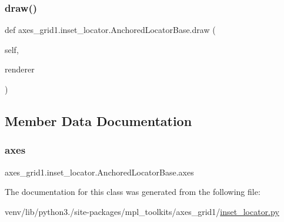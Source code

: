 \subsubsection{\texorpdfstring{draw()}{draw()}}
{\footnotesize\ttfamily def axes\+\_\+grid1.\+inset\+\_\+locator.\+Anchored\+Locator\+Base.\+draw (\begin{DoxyParamCaption}\item[{}]{self,  }\item[{}]{renderer }\end{DoxyParamCaption})}



\subsection{Member Data Documentation}
\mbox{\label{classaxes__grid1_1_1inset__locator_1_1AnchoredLocatorBase_a23ab77b0ced871503d9b10c9d24bb685}} 
\subsubsection{\texorpdfstring{axes}{axes}}
{\footnotesize\ttfamily axes\+\_\+grid1.\+inset\+\_\+locator.\+Anchored\+Locator\+Base.\+axes}



The documentation for this class was generated from the following file\+:\begin{DoxyCompactItemize}
\item 
venv/lib/python3./site-\/packages/mpl\+\_\+toolkits/axes\+\_\+grid1/\hyperlink{_2inset__locator_8py}{inset\+\_\+locator.\+py}\end{DoxyCompactItemize}
